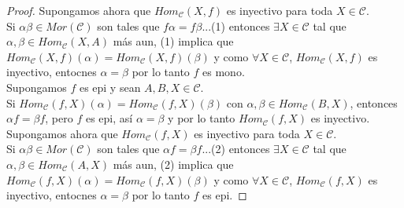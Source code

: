 \documentclass{article}
\begin{document}
\begin{enumerate}[label=\textbf{Ej \arabic*.}]
\begin{proof}
Supongamos ahora que $Hom_\mathscr{C}(X,f)$ es inyectivo para toda $X\in \mathscr{C}$.\\
Si $\alpha\beta\in Mor(\mathscr{C})$ son tales que $f\alpha =f\beta $...(1) entonces $\exists X\in \mathscr{C}$ tal que
 $\alpha,\beta\in Hom_{\mathscr{C}}(X,A)$ más aun, (1) implica que \\ $Hom_{\mathscr{C}}(X,f)(\alpha)=Hom_{\mathscr{C}}(X,f)(\beta)$ y como
$\forall X\in \mathscr{C}$, $Hom_{\mathscr{C}}(X,f)$ es inyectivo, entocnes $\alpha=\beta$ por lo tanto $f$ es mono.\\

 Supongamos $f$ es epi y sean $A,B,X\in \mathscr{C}$. \\
Si $ Hom_{\mathscr{C}}(f,X)(\alpha)=Hom_{\mathscr{C}}(f,X)(\beta)$ con $\alpha,\beta\in Hom_{\mathscr{C}}(B,X)$, entonces
$\alpha f=\beta f$, pero $f$ es epi, así $\alpha=\beta$ y por lo tanto $Hom_{\mathscr{C}}(f,X)$ es inyectivo.\\

Supongamos ahora que $Hom_\mathscr{C}(f,X)$ es inyectivo para toda $X\in \mathscr{C}$.\\
Si $\alpha\beta\in Mor(\mathscr{C})$ son tales que $\alpha f=\beta f$...(2) entonces $\exists X\in \mathscr{C}$ tal que
 $\alpha,\beta\in Hom_{\mathscr{C}}(A,X)$ más aun, (2) implica que $Hom_{\mathscr{C}}(f,X)(\alpha)=Hom_{\mathscr{C}}(f,X)(\beta)$ y como
$\forall X\in \mathscr{C}$, $Hom_{\mathscr{C}}(f,X)$ es inyectivo, entocnes $\alpha=\beta$ por lo tanto $f$ es epi.


\end{proof}



\end{enumerate}
\end{document}
